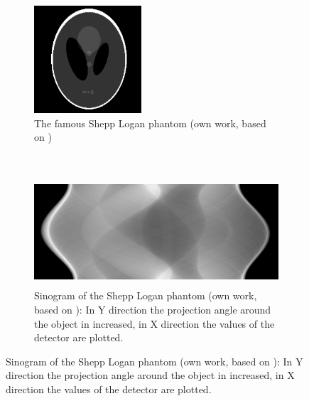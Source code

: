 \begin{figure}[h!]
	\centering
	\begin{subfigure}[b]{0.28\textwidth}
		\centering
		\includegraphics[height=4cm]{images/shepp_logan.png}
		\caption{The famous Shepp Logan phantom (own work, based on \cite{shepploganphantom})}
		\label{shepplogan}
	\end{subfigure}%
	~
	\begin{subfigure}[b]{0.68\textwidth}
		\centering
		\includegraphics[height=4cm]{images/shepp_logan_sino.png}
		\caption{Sinogram of the Shepp Logan phantom (own work, based on \cite{shepploganphantom}): In Y direction the projection angle around the object in increased, in X direction the values of the detector are plotted.}
		\label{shepplogansino}
	\end{subfigure}%
\end{figure}
